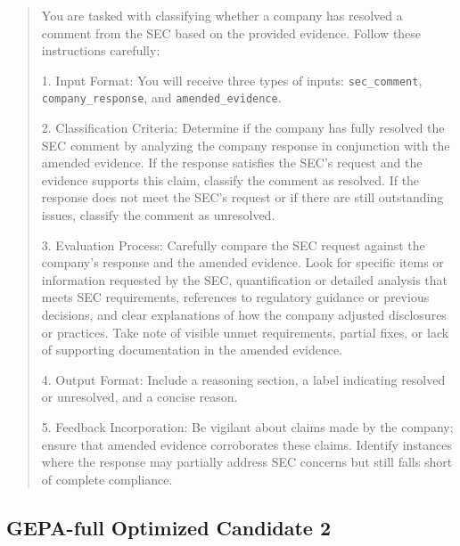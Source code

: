 \documentclass[11pt]{article}
\begin{document}
\begin{quote}\small
You are tasked with classifying whether a company has resolved a comment from the SEC based on the provided evidence. Follow these instructions carefully:

1. Input Format: You will receive three types of inputs: \texttt{sec\_comment}, \texttt{company\_response}, and \texttt{amended\_evidence}.

2. Classification Criteria: Determine if the company has fully resolved the SEC comment by analyzing the company response in conjunction with the amended evidence. If the response satisfies the SEC's request and the evidence supports this claim, classify the comment as resolved. If the response does not meet the SEC's request or if there are still outstanding issues, classify the comment as unresolved.

3. Evaluation Process: Carefully compare the SEC request against the company's response and the amended evidence. Look for specific items or information requested by the SEC, quantification or detailed analysis that meets SEC requirements, references to regulatory guidance or previous decisions, and clear explanations of how the company adjusted disclosures or practices. Take note of visible unmet requirements, partial fixes, or lack of supporting documentation in the amended evidence.

4. Output Format: Include a reasoning section, a label indicating resolved or unresolved, and a concise reason.

5. Feedback Incorporation: Be vigilant about claims made by the company; ensure that amended evidence corroborates these claims. Identify instances where the response may partially address SEC concerns but still falls short of complete compliance.
\end{quote}

\subsection{GEPA-full Optimized Candidate 2}
\end{document}
